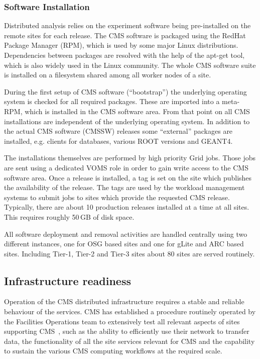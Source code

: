 \subsubsection{ Software Installation }
\label{sec:4_1_3}
Distributed analysis relies on the experiment software being
pre-installed on the remote sites for each release. The CMS software
is packaged using the RedHat Package Manager (RPM), which is used by
some major Linux distributions. Dependencies between packages are
resolved with the help of the apt-get tool, which is also widely used in
the Linux community. The whole CMS software suite is installed
on a filesystem shared among all worker nodes of a site.

During the
first setup of CMS software (``bootstrap'') the underlying operating system is
checked for all required packages. These are imported into a meta-RPM,
which is installed in the CMS software area. From that point on all
CMS installations are independent of the underlying operating
system. In addition to the actual CMS software (CMSSW) releases some ``external'' 
packages are installed, e.g. clients for databases, various ROOT
versions and GEANT4.

The installations themselves are performed by high priority Grid
jobs. Those jobs are sent using a dedicated VOMS role %
in order to gain write access to the CMS software area. Once a release is
installed, a tag is set on the 
site which publishes the availability of
the release. The tags are used by the workload management systems to
submit jobs to sites which provide the requested CMS release.
Typically, there are about 10 production releases installed at a time at all
sites. This requires roughly 50\,GB of disk space.

All software deployment and  removal activities are handled centrally
using two different instances, one for OSG based sites and one for
gLite and ARC based sites. Including Tier-1, Tier-2 and Tier-3
sites about 80 sites are served routinely.

\subsection{Infrastructure readiness}
\label{sec:4_2}
Operation of the CMS distributed infrastructure requires a stable and 
reliable behaviour of the services.
CMS has established a procedure routinely operated by the Facilities 
Operations team to extensively test all relevant aspects of sites 
supporting CMS~\cite{RefSite}, such as the ability to efficiently use their 
network to transfer data, the functionality of all the site services relevant 
for CMS and the capability to sustain the various CMS computing workflows at 
the required scale.

